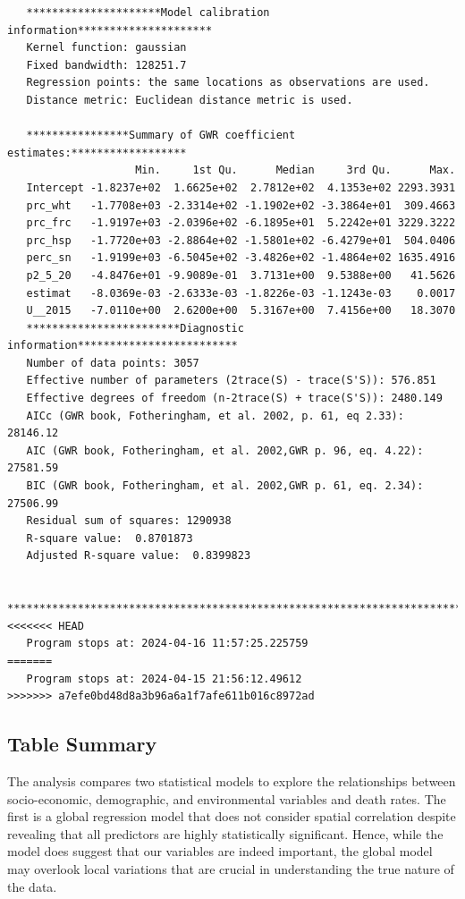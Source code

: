 \documentclass[
]{article}
\begin{document}
\begin{verbatim}
   *********************Model calibration information*********************
   Kernel function: gaussian 
   Fixed bandwidth: 128251.7 
   Regression points: the same locations as observations are used.
   Distance metric: Euclidean distance metric is used.

   ****************Summary of GWR coefficient estimates:******************
                    Min.     1st Qu.      Median     3rd Qu.      Max.
   Intercept -1.8237e+02  1.6625e+02  2.7812e+02  4.1353e+02 2293.3931
   prc_wht   -1.7708e+03 -2.3314e+02 -1.1902e+02 -3.3864e+01  309.4663
   prc_frc   -1.9197e+03 -2.0396e+02 -6.1895e+01  5.2242e+01 3229.3222
   prc_hsp   -1.7720e+03 -2.8864e+02 -1.5801e+02 -6.4279e+01  504.0406
   perc_sn   -1.9199e+03 -6.5045e+02 -3.4826e+02 -1.4864e+02 1635.4916
   p2_5_20   -4.8476e+01 -9.9089e-01  3.7131e+00  9.5388e+00   41.5626
   estimat   -8.0369e-03 -2.6333e-03 -1.8226e-03 -1.1243e-03    0.0017
   U__2015   -7.0110e+00  2.6200e+00  5.3167e+00  7.4156e+00   18.3070
   ************************Diagnostic information*************************
   Number of data points: 3057 
   Effective number of parameters (2trace(S) - trace(S'S)): 576.851 
   Effective degrees of freedom (n-2trace(S) + trace(S'S)): 2480.149 
   AICc (GWR book, Fotheringham, et al. 2002, p. 61, eq 2.33): 28146.12 
   AIC (GWR book, Fotheringham, et al. 2002,GWR p. 96, eq. 4.22): 27581.59 
   BIC (GWR book, Fotheringham, et al. 2002,GWR p. 61, eq. 2.34): 27506.99 
   Residual sum of squares: 1290938 
   R-square value:  0.8701873 
   Adjusted R-square value:  0.8399823 

   ***********************************************************************
<<<<<<< HEAD
   Program stops at: 2024-04-16 11:57:25.225759 
=======
   Program stops at: 2024-04-15 21:56:12.49612 
>>>>>>> a7efe0bd48d8a3b96a6a1f7afe611b016c8972ad
\end{verbatim}

\subsection{Table Summary}\label{table-summary}

The analysis compares two statistical models to explore the
relationships between socio-economic, demographic, and environmental
variables and death rates. The first is a global regression model that
does not consider spatial correlation despite revealing that all
predictors are highly statistically significant. Hence, while the model
does suggest that our variables are indeed important, the global model
may overlook local variations that are crucial in understanding the true
nature of the data.
\end{document}
